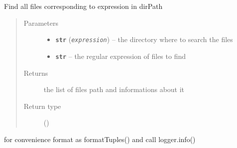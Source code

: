 \documentclass[a4paper,10pt,english]{sphinxmanual}
\begin{document}

\begin{fulllineitems}
\label{commands/apidoc/src:src.utilsSat.list_log_file}
Find all files corresponding to expression in dirPath
\begin{quote}\begin{description}
\item[{Parameters}] \leavevmode\begin{itemize}
\item {} 
\textbf{\texttt{str}} (\emph{\texttt{expression}}) -- the directory where to search the files

\item {} 
\textbf{\texttt{str}} -- the regular expression of files to find

\end{itemize}

\item[{Returns}] \leavevmode
the list of files path and informations about it

\item[{Return type}] \leavevmode
{\hyperref[commands/apidoc/src:src.utilsSat.Path.list]{}} ()

\end{description}\end{quote}

\end{fulllineitems}


\begin{fulllineitems}
\label{commands/apidoc/src:src.utilsSat.logger_info_tuples}
for convenience
format as formatTuples() and call logger.info()

\end{fulllineitems}


\begin{fulllineitems}
\label{commands/apidoc/src:src.utilsSat.magenta}
\end{fulllineitems}
\end{document}
